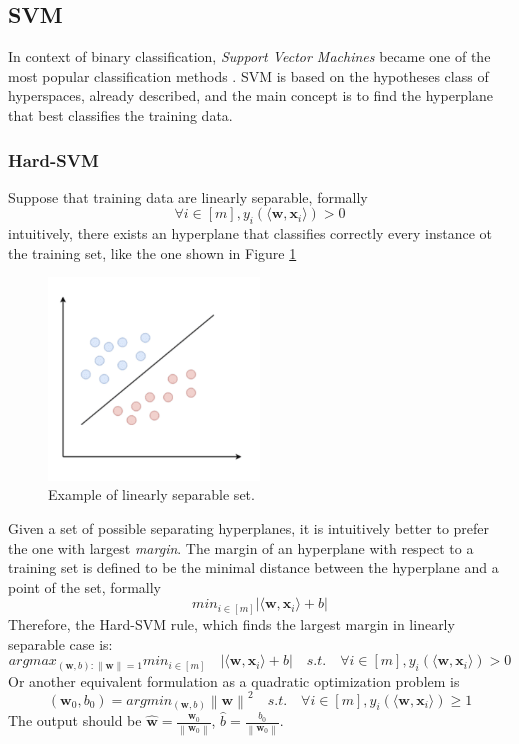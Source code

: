 \subsection{SVM}

In context of binary classification, \textit{Support Vector Machines} became one of the most popular classification methods \cite{article-svm}. SVM is based on the hypotheses class of hyperspaces, already described, and the main concept is to find the hyperplane that best classifies the training data.

\subsubsection{Hard-SVM}

Suppose that training data are linearly separable, formally
\[ \forall i \in [m], y_i (\langle \mathbf{w}, \mathbf{x}_i \rangle) > 0 \]
intuitively, there exists an hyperplane that classifies correctly every instance ot the training set, like the one shown in Figure \ref{fig:linearly-separable}

\begin{figure}[ht]
	\centering
	\includegraphics[width=0.5\textwidth]{figures/linearly-separable.png}
	\caption{Example of linearly separable set.}
	\label{fig:linearly-separable}
\end{figure}

Given a set of possible separating hyperplanes, it is intuitively better to prefer the one with largest \textit{margin}. The margin of an hyperplane with respect to a training set is defined to be the minimal distance between the hyperplane and a point of the set, formally
\[ min_{i \in [m]} | \langle \mathbf{w}, \mathbf{x}_i \rangle + b | \]
Therefore, the Hard-SVM rule, which finds the largest margin in linearly separable case is:
\[ argmax_{(\mathbf{w}, b) : \left\lVert \mathbf{w} \right\rVert = 1} min_{i \in [m]} \quad | \langle \mathbf{w}, \mathbf{x}_i \rangle + b | \quad s.t. \quad \forall i \in [m], y_i (\langle \mathbf{w}, \mathbf{x}_i \rangle) > 0 \]
Or another equivalent formulation as a quadratic optimization problem is
\[ (\mathbf{w}_0, b_0) = argmin_{(\mathbf{w}, b)} \left\lVert \mathbf{w} \right\rVert ^2 \quad s.t. \quad \forall i \in [m], y_i (\langle \mathbf{w}, \mathbf{x}_i \rangle) \ge 1 \]
The output should be $\hat{\mathbf{w}} = \frac{\mathbf{w}_0}{\left\lVert \mathbf{w}_0 \right\rVert}$, $\hat{b} = \frac{b_0}{\left\lVert \mathbf{w}_0 \right\rVert}$.

